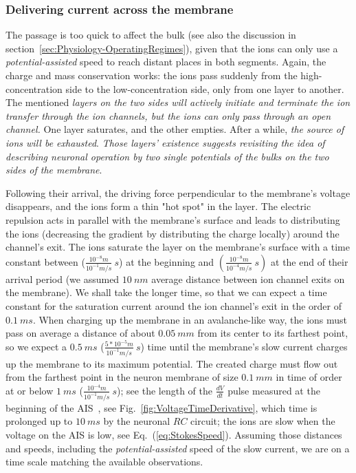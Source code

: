 \subsubsection[Delivering current]{Delivering current across the membrane\label{Electrodiffusion_DeliveringCurrentLayers}}
The passage is too quick to affect the bulk (see also the discussion
in section~\ref{sec:Physiology-OperatingRegimes}), given that the ions
can only use a \emph{potential-assisted} speed to reach distant places
in both segments. Again, the charge and mass conservation works: the
ions pass suddenly from the high-concentration side to the low-concentration
side, only from one layer to another.
The mentioned \emph{layers on the two sides will actively
initiate and terminate the ion transfer through the ion channels,
but the ions can only pass through an open channel.}
One layer saturates, and the
other empties. After a while, \emph{the source of ions will be exhausted}.
\emph{Those layers' existence suggests revisiting the idea of describing
neuronal operation by two single potentials of the bulks on the two
sides of the membrane}.

Following their arrival, the driving force perpendicular to the membrane's voltage disappears, and the ions form a thin "hot spot" in the layer. 
The electric repulsion acts in parallel with the membrane's surface and
leads to distributing the ions (decreasing the gradient by distributing the charge locally) around
the channel's exit.
The ions saturate the layer on the membrane's surface with a time constant
between ($\frac{10^{-8}m}{10^{-1}m/s}\ s$) at the beginning
and $(\frac{10^{-8}m}{10^{-4}m/s}\ s)$
at the end of their arrival period (we assumed $10\ nm$ average distance between
ion channel exits on the membrane). We shall take the longer time,
so that we can expect a time constant for the saturation current around
the ion channel's exit in the order of $0.1\ ms$. When charging up
the membrane in an avalanche-like way, the ions must pass on average
a distance of about $0.05\ mm$ from its center to its farthest point,
so we expect a $0.5\ ms$ ($\frac{5*10^{-5}m}{10^{-1}m/s}\ s$) time
until the membrane's slow current charges up the membrane to its maximum
potential. The created charge must flow out from the farthest point
in the neuron membrane of size $0.1\ mm$ in time of order at or below
$1\ ms$ ($\frac{10^{-4}m}{10^{-1}m/s}\ s$); see the length of the
$\frac{dV}{dt}$ pulse measured at the beginning of the 
\gls{AIS}~\cite{BeanActionPotential:2007},
see Fig.~\ref{fig:VoltageTimeDerivative}, which time is prolonged
up to $10\ ms$ by the neuronal $RC$ circuit; the ions are slow when
the voltage on the \gls{AIS}
is low, see Eq.~(\ref{eq:StokesSpeed}).
Assuming those distances and speeds, including the \emph{potential-assisted}
speed of the slow current, we are on a time scale matching the available
observations.



